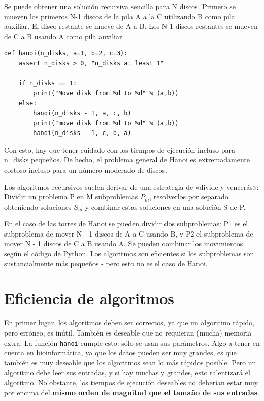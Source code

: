 Se puede obtener una solución recursiva sencilla para N discos. Primero se mueven los primeros N-1 discos de la pila A a la C utilizando B como pila auxiliar. El disco restante se mueve de A a B. Los N-1 discos restantes se mueven de C a B usando A como pila auxiliar. 
\begin{lstlisting}
def hanoi(n_disks, a=1, b=2, c=3):
	assert n_disks > 0, "n_disks at least 1"
	
	if n_disks == 1:
		print("Move disk from %d to %d" % (a,b))
	else:
		hanoi(n_disks - 1, a, c, b)
		print("move disk from %d to %d" % (a,b))
		hanoi(n_disks - 1, c, b, a)
\end{lstlisting}

Con esto, hay que tener cuidado con los tiempos de ejecución incluso para n\_disks pequeños. De hecho, el problema general de Hanoi es extremadamente costoso incluso para un número moderado de discos.

Los algoritmos recursivos suelen derivar de una estrategia de «divide y vencerás»: Dividir un problema P en M subproblemas $P_m$, resolverlos por separado obteniendo soluciones $S_m$ y combinar estas soluciones en una solución S de P.

En el caso de las torres de Hanoi se pueden dividir dos subproblemas: P1 es el subproblema de mover N - 1 discos de A a C usando B, y P2 el subproblema de mover N - 1 discos de C a B usando A. Se pueden combinar los movimientos según el código de Python. Los algoritmos son eficientes si los subproblemas son sustancialmente más pequeños - pero esto no es el caso de Hanoi.

\section{Eficiencia de algoritmos}
En primer lugar, los algoritmos deben ser correctos, ya que un algoritmo rápido, pero erróneo, es inútil.  También es deseable que no requieran (mucha) memoria extra. La función \texttt{hanoi} cumple esto: sólo se usan sus parámetros. Algo a tener en cuenta en bioinformática, ya que los datos pueden ser muy grandes, es que también es muy deseable que los algoritmos sean lo más rápidos posible. Pero un algoritmo debe leer sus entradas, y si hay muchas y grandes, esto ralentizará el algoritmo. No obstante, los tiempos de ejecución deseables no deberían estar muy por encima del \textbf{mismo orden de magnitud que el tamaño de sus entradas}.

